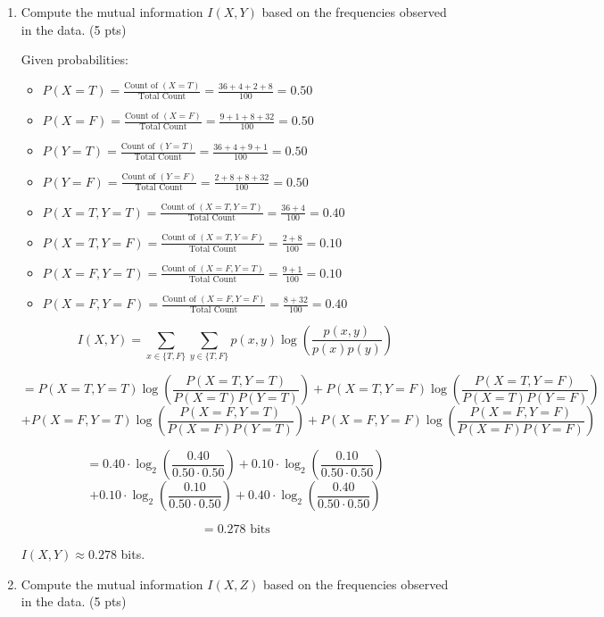 \documentclass[a4paper]{article}
\theoremstyle{definition}
\newenvironment{soln}{
	\leavevmode\color{blue}\ignorespaces
}{}
\begin{document}
\begin{enumerate}
	\item Compute the mutual information $I(X, Y)$ based on the frequencies observed in the data. (5 pts)
	\begin{soln}
		Given probabilities:
		\begin{itemize}
			\item $P(X=T) = \frac{\text{Count of }(X=T)}{\text{Total Count}} = \frac{36 + 4 + 2 + 8}{100} = 0.50$
			\item $P(X=F) = \frac{\text{Count of }(X=F)}{\text{Total Count}} = \frac{9 + 1 + 8 + 32}{100} = 0.50$
			\item $P(Y=T) = \frac{\text{Count of }(Y=T)}{\text{Total Count}} = \frac{36 + 4 + 9 + 1}{100} = 0.50$
			\item $P(Y=F) = \frac{\text{Count of }(Y=F)}{\text{Total Count}} = \frac{2 + 8 + 8 + 32}{100} = 0.50$
			\item $P(X=T, Y=T) = \frac{\text{Count of }(X=T, Y=T)}{\text{Total Count}} = \frac{36 + 4}{100} = 0.40$
			\item $P(X=T, Y=F) = \frac{\text{Count of }(X=T, Y=F)}{\text{Total Count}} = \frac{2 + 8}{100} = 0.10$
			\item $P(X=F, Y=T) = \frac{\text{Count of }(X=F, Y=T)}{\text{Total Count}} = \frac{9 + 1}{100} = 0.10$
			\item $P(X=F, Y=F) = \frac{\text{Count of }(X=F, Y=F)}{\text{Total Count}} = \frac{8 + 32}{100} = 0.40$
		\end{itemize}


		\[
		I(X, Y) = \sum_{x \in \{T, F\}} \sum_{y \in \{T, F\}} p(x, y) \log\left(\frac{p(x, y)}{p(x)p(y)}\right)
		\]

		\[
		= P(X=T, Y=T) \log\left(\frac{P(X=T, Y=T)}{P(X=T)P(Y=T)}\right) + P(X=T, Y=F) \log\left(\frac{P(X=T, Y=F)}{P(X=T)P(Y=F)}\right)
		\]
		\[
		+ P(X=F, Y=T) \log\left(\frac{P(X=F, Y=T)}{P(X=F)P(Y=T)}\right) + P(X=F, Y=F) \log\left(\frac{P(X=F, Y=F)}{P(X=F)P(Y=F)}\right)
		\]

		\[
		= 0.40 \cdot \log_2\left(\frac{0.40}{0.50 \cdot 0.50}\right) + 0.10 \cdot \log_2\left(\frac{0.10}{0.50 \cdot 0.50}\right)
		\]
		\[
		+ 0.10 \cdot \log_2\left(\frac{0.10}{0.50 \cdot 0.50}\right) + 0.40 \cdot \log_2\left(\frac{0.40}{0.50 \cdot 0.50}\right)
		\]

		\[
		= 0.278 \text{ bits}
		\]

		$I(X, Y) \approx 0.278$ bits.

	\end{soln}
	\item Compute the mutual information $I(X, Z)$ based on the frequencies observed in the data. (5 pts)
	\begin{soln}


\end{soln}
\end{enumerate}
\end{document}
